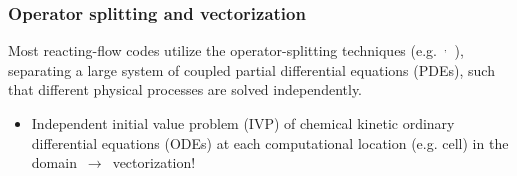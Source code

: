 \documentclass{beamer}
\begin{document}
\begin{frame}
 \frametitle{Operator splitting and vectorization}
 Most reacting-flow codes utilize the operator-splitting techniques (e.g.~$^{,}$~), separating a large system of coupled partial differential equations (PDEs), such that different physical processes are solved independently.
 \begin{itemize}
  \item Independent initial value problem (IVP) of chemical kinetic ordinary differential equations (ODEs) at each computational location (e.g. cell) in the domain~$\rightarrow$~vectorization!
 \end{itemize}
\end{frame}
\end{document}
